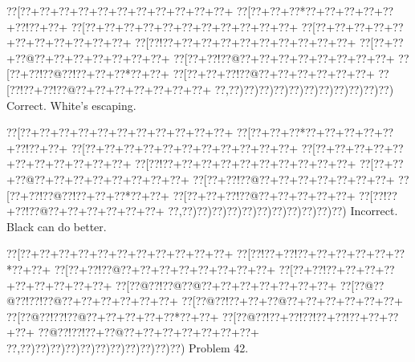 \documentclass[a5paper]{article}
\begin{document}
\begin{center}
{\goo
\0??[\0??+\0??+\0??+\0??+\0??+\0??+\0??+\0??+\0??+\0??+\0??+
\0??[\0??+\0??+\0??*\0??+\0??+\0??+\0??+\0??+\0??!\0??+\0??+
\0??[\0??+\0??+\0??+\0??+\0??+\0??+\0??+\0??+\0??+\0??+\0??+
\0??[\0??+\0??+\0??+\0??+\0??+\0??+\0??+\0??+\0??+\0??+\0??+
\0??[\0??!\0??+\0??+\0??+\0??+\0??+\0??+\0??+\0??+\0??+\0??+
\0??[\0??+\0??+\0??@\0??+\0??+\0??+\0??+\0??+\0??+\0??+
\0??[\0??+\0??!\0??@\0??+\0??+\0??+\0??+\0??+\0??+\0??+\0??+
\0??[\0??+\0??!\0??@\0??!\0??+\0??+\0??*\0??+\0??+
\0??[\0??+\0??+\0??!\0??@\0??+\0??+\0??+\0??+\0??+\0??+
\0??[\0??!\0??+\0??!\0??@\0??+\0??+\0??+\0??+\0??+\0??+\0??+
\0??,\0??)\0??)\0??)\0??)\0??)\0??)\0??)\0??)\0??)\0??)\0??)
}
Correct. White's escaping.

\end{center}
\begin{center}
{\goo
\0??[\0??+\0??+\0??+\0??+\0??+\0??+\0??+\0??+\0??+\0??+\0??+
\0??[\0??+\0??+\0??*\0??+\0??+\0??+\0??+\0??+\0??!\0??+\0??+
\0??[\0??+\0??+\0??+\0??+\0??+\0??+\0??+\0??+\0??+\0??+\0??+
\0??[\0??+\0??+\0??+\0??+\0??+\0??+\0??+\0??+\0??+\0??+\0??+
\0??[\0??!\0??+\0??+\0??+\0??+\0??+\0??+\0??+\0??+\0??+\0??+
\0??[\0??+\0??+\0??@\0??+\0??+\0??+\0??+\0??+\0??+\0??+\0??+
\0??[\0??+\0??!\0??@\0??+\0??+\0??+\0??+\0??+\0??+\0??+
\0??[\0??+\0??!\0??@\0??!\0??+\0??+\0??*\0??+\0??+
\0??[\0??+\0??+\0??!\0??@\0??+\0??+\0??+\0??+\0??+
\0??[\0??!\0??+\0??!\0??@\0??+\0??+\0??+\0??+\0??+\0??+
\0??,\0??)\0??)\0??)\0??)\0??)\0??)\0??)\0??)\0??)\0??)\0??)
}
Incorrect. Black can do better.

\end{center}
\newpage
\begin{center}
{\goo
\0??[\0??+\0??+\0??+\0??+\0??+\0??+\0??+\0??+\0??+\0??+\0??+
\0??[\0??!\0??+\0??!\0??+\0??+\0??+\0??+\0??+\0??*\0??+\0??+
\0??[\0??+\0??!\0??@\0??+\0??+\0??+\0??+\0??+\0??+\0??+\0??+
\0??[\0??+\0??!\0??+\0??+\0??+\0??+\0??+\0??+\0??+\0??+\0??+
\0??[\0??@\0??!\0??@\0??@\0??+\0??+\0??+\0??+\0??+\0??+\0??+
\0??[\0??@\0??@\0??!\0??!\0??@\0??+\0??+\0??+\0??+\0??+\0??+
\0??[\0??@\0??!\0??+\0??+\0??@\0??+\0??+\0??+\0??+\0??+\0??+
\0??[\0??@\0??!\0??!\0??@\0??+\0??+\0??+\0??+\0??*\0??+\0??+
\0??[\0??@\0??!\0??+\0??!\0??!\0??+\0??!\0??+\0??+\0??+\0??+
\0??@\0??!\0??!\0??+\0??@\0??+\0??+\0??+\0??+\0??+\0??+\0??+
\0??,\0??)\0??)\0??)\0??)\0??)\0??)\0??)\0??)\0??)\0??)\0??)
}
Problem 42.

\end{center}
\end{document}
